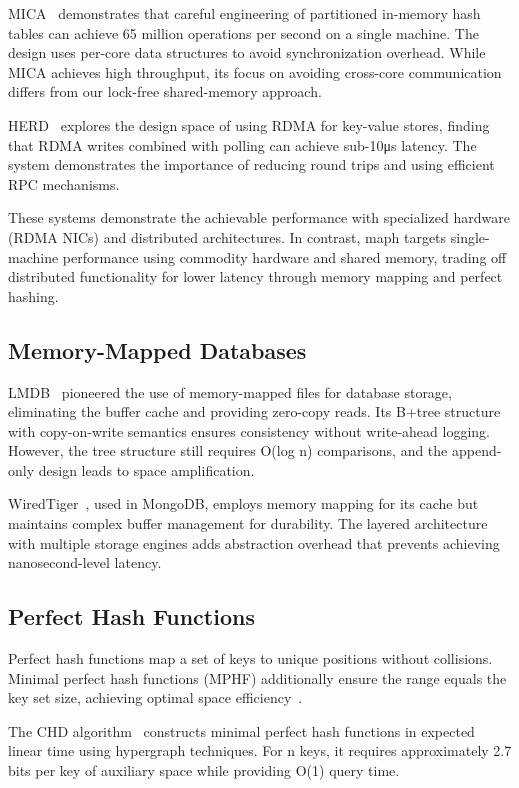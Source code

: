 \documentclass[10pt,conference]{IEEEtran}
\begin{document}
MICA~\cite{mica} demonstrates that careful engineering of partitioned in-memory hash tables can achieve 65 million operations per second on a single machine. The design uses per-core data structures to avoid synchronization overhead. While MICA achieves high throughput, its focus on avoiding cross-core communication differs from our lock-free shared-memory approach.

HERD~\cite{herd} explores the design space of using RDMA for key-value stores, finding that RDMA writes combined with polling can achieve sub-10μs latency. The system demonstrates the importance of reducing round trips and using efficient RPC mechanisms.

These systems demonstrate the achievable performance with specialized hardware (RDMA NICs) and distributed architectures. In contrast, maph targets single-machine performance using commodity hardware and shared memory, trading off distributed functionality for lower latency through memory mapping and perfect hashing.

\subsection{Memory-Mapped Databases}

LMDB~\cite{lmdb} pioneered the use of memory-mapped files for database storage, eliminating the buffer cache and providing zero-copy reads. Its B+tree structure with copy-on-write semantics ensures consistency without write-ahead logging. However, the tree structure still requires O(log n) comparisons, and the append-only design leads to space amplification.

WiredTiger~\cite{wiredtiger}, used in MongoDB, employs memory mapping for its cache but maintains complex buffer management for durability. The layered architecture with multiple storage engines adds abstraction overhead that prevents achieving nanosecond-level latency.

\subsection{Perfect Hash Functions}

Perfect hash functions map a set of keys to unique positions without collisions. Minimal perfect hash functions (MPHF) additionally ensure the range equals the key set size, achieving optimal space efficiency~\cite{mphf-survey}.

The CHD algorithm~\cite{chd-algorithm} constructs minimal perfect hash functions in expected linear time using hypergraph techniques. For n keys, it requires approximately 2.7 bits per key of auxiliary space while providing O(1) query time.
\end{document}
